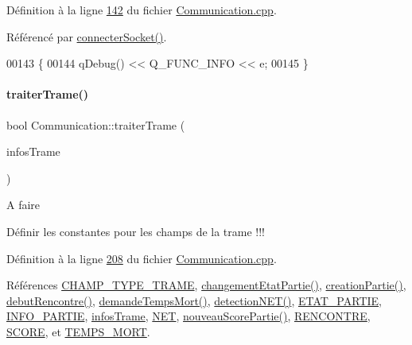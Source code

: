 Définition à la ligne \hyperlink{_communication_8cpp_source_l00142}{142} du fichier \hyperlink{_communication_8cpp_source}{Communication.\+cpp}.



Référencé par \hyperlink{_communication_8cpp_source_l00116}{connecter\+Socket()}.


\begin{DoxyCode}
00143 \{
00144     qDebug() << Q\_FUNC\_INFO << e;
00145 \}
\end{DoxyCode}
\mbox{\label{class_communication_a1f17fd8330b55b3ab30263d15e6e740b}} 
\paragraph{\texorpdfstring{traiter\+Trame()}{traiterTrame()}}
{\footnotesize\ttfamily bool Communication\+::traiter\+Trame (\begin{DoxyParamCaption}\item[{Q\+String\+List}]{infos\+Trame }\end{DoxyParamCaption})\hspace{0.3cm}{\ttfamily [private]}}

\begin{DoxyRefDesc}{A faire}
\item[\hyperlink{todo__todo000004}{A faire}]Définir les constantes pour les champs de la trame !!! \end{DoxyRefDesc}


Définition à la ligne \hyperlink{_communication_8cpp_source_l00208}{208} du fichier \hyperlink{_communication_8cpp_source}{Communication.\+cpp}.



Références \hyperlink{_communication_8h_source_l00020}{C\+H\+A\+M\+P\+\_\+\+T\+Y\+P\+E\+\_\+\+T\+R\+A\+ME}, \hyperlink{class_communication_af5444d470230a6e817ca8bc9484eb169}{changement\+Etat\+Partie()}, \hyperlink{class_communication_a3d8a1dccee9867e6b84932ddc3072b45}{creation\+Partie()}, \hyperlink{class_communication_af3430c844d728e4ec3961744243324e1}{debut\+Rencontre()}, \hyperlink{class_communication_ab2dd9f10ceaba18016017104683b6fc1}{demande\+Temps\+Mort()}, \hyperlink{class_communication_a4c828450e0ff92818c878ee28f240662}{detection\+N\+E\+T()}, \hyperlink{_communication_8h_source_l00031}{E\+T\+A\+T\+\_\+\+P\+A\+R\+T\+IE}, \hyperlink{_communication_8h_source_l00029}{I\+N\+F\+O\+\_\+\+P\+A\+R\+T\+IE}, \hyperlink{_communication_8h_source_l00058}{infos\+Trame}, \hyperlink{_communication_8h_source_l00032}{N\+ET}, \hyperlink{class_communication_acf4446d47652e0c508296e52df6fb11b}{nouveau\+Score\+Partie()}, \hyperlink{_communication_8h_source_l00028}{R\+E\+N\+C\+O\+N\+T\+RE}, \hyperlink{_communication_8h_source_l00030}{S\+C\+O\+RE}, et \hyperlink{_communication_8h_source_l00033}{T\+E\+M\+P\+S\+\_\+\+M\+O\+RT}.



